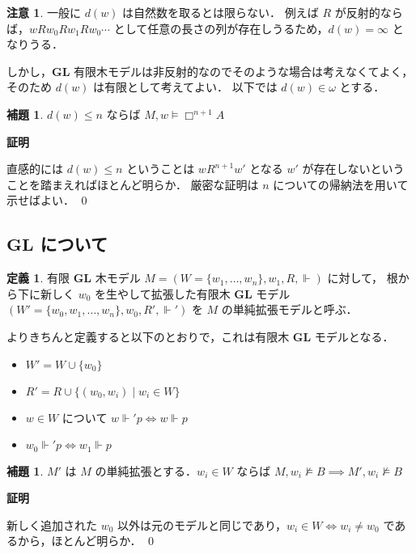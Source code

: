 \documentclass{jsarticle}
\makeatletter
\newcommand*{\Logic}[1]{\mathbf{#1}}
\newcommand*{\LogicGL}{\Logic{GL}}
\theoremstyle{definition}
\newtheorem{lemma}[theorem]{補題}
\newtheorem{definition}[theorem]{定義}
\newtheorem{remark}[theorem]{注意}
\renewcommand{\proofname}{証明}
\renewenvironment{proof}[1][\proofname]{\par
    \normalfont 
    \topsep6\p@\@plus6\p@\relax
    \trivlist
    \item\relax
    {\bfseries\gtfamily
    #1\@addpunct{.}}\hspace\labelsep\ignorespaces
    }{%
    \endtrivlist
    \@endpefalse
}
\makeatother
\begin{document}
\begin{remark}
    一般に $d(w)$ は自然数を取るとは限らない．
    例えば $R$ が反射的ならば，$w R w_0 R w_1 R w_0 \cdots$ として任意の長さの列が存在しうるため，$d(w) = \infty$ となりうる．

    しかし，$\LogicGL$ 有限木モデルは非反射的なのでそのような場合は考えなくてよく，そのため $d(w)$ は有限として考えてよい．
    以下では $d(w) \in \omega$ とする．
\end{remark}

\begin{lemma}\label{lem:cannot_access}
    $d(w) \leq n$ ならば $M,w \vDash \Box^{n + 1} A$
\end{lemma}

\begin{proof}
    直感的には $d(w) \leq n$ ということは $w R^{n + 1} w'$ となる $w'$ が存在しないということを踏まえればほとんど明らか．
    厳密な証明は $n$ についての帰納法を用いて示せばよい．
    \qed
\end{proof}

\subsection{$\LogicGL$ について}

\begin{definition}
    有限 $\LogicGL$ 木モデル $M = (W = \{w_1,\dots,w_n\}, w_1, R, \Vdash)$ に対して，
    根から下に新しく $w_0$ を生やして拡張した有限木 $\LogicGL$ モデル $(W' = \{w_0,w_1,\dots,w_n\}, w_0, R', \Vdash')$ を $M$ の単純拡張モデルと呼ぶ．

    よりきちんと定義すると以下のとおりで，これは有限木 $\LogicGL$ モデルとなる．
    \begin{itemize}
        \item $W' = W \cup \{w_0\}$
        \item $R' = R \cup \{(w_0,w_i) \mid w_i \in W\}$
        \item $w \in W$ について $w \Vdash' p \iff w \Vdash p$
        \item $w_0 \Vdash' p \iff w_1 \Vdash p$
    \end{itemize}
\end{definition}

\begin{lemma}\label{lem:simple_extension}
    $M'$ は $M$ の単純拡張とする．$w_i \in W$ ならば $M,w_i \nvDash B \implies M',w_i \nvDash B$
\end{lemma}
\begin{proof}
    新しく追加された $w_0$ 以外は元のモデルと同じであり，$w_i \in W \iff w_i \neq w_0$ であるから，ほとんど明らか．
    \qed
\end{proof}
\end{document}
